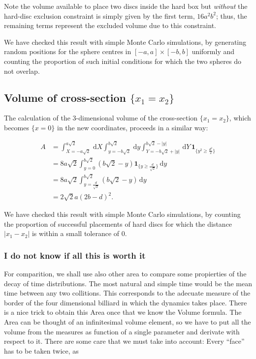 \documentclass[letterpaper,10pt]{article}
\newcommand{\rd}{\, \mathrm{d}}
\newcommand{\indicator}[1]{\mathbf{1}_{ \{   #1 \} } }
\begin{document}
Note the volume available to place two discs inside the hard box but \emph{without} the 
 hard-disc exclusion constraint is simply given by the first term, $16 a^2 b^2$; thus, the remaining terms represent the excluded volume due to this constraint.

We have checked this result with simple Monte Carlo simulations, by generating random positions for the sphere centres in $[-a,a] \times [-b,b]$ uniformly and 
counting the proportion of such initial conditions for which the two spheres do not overlap.



\subsection{Volume of cross-section $\{x_1 = x_2\}$}
The calculation of the $3$-dimensional volume of the cross-section $\{x_1 = x_2\}$, which becomes 
$\{ x=0 \}$ in the new coordinates, proceeds in a similar way:

\begin{align}
 A &= \int_{X=-a \sqrt{2} }^{a \sqrt{2}}  \rd X
 \int_{y=-b \sqrt{2}}^{b \sqrt{2}} \rd y
\int_{Y=-b \sqrt{2} + |y| }^{b \sqrt{2}-|y|}  \rd Y
\, \indicator{y^2 \ge \frac{d^2}{2} } \\
&= 8 a \sqrt{2} \int_{y=0}^{b \sqrt{2}} \left( b \sqrt{2} - y \right)  \indicator{y \ge \frac{d}{\sqrt{2}}}  \rd y \\
&= 8 a \sqrt{2} \int_{y= \frac{d}{\sqrt{2}}}^{b \sqrt{2}}  \left( b \sqrt{2} - y \right)  \rd y \\
&= 2 \sqrt{2} a ( 2b - d )^2.
\end{align}

We have checked this result with simple Monte Carlo simulations, by counting the proportion of successful placements of hard discs for which the distance $|x_1 - x_2|$ is within a small tolerance of $0$.


\subsubsection{I do not know if all this is worth it\ldot}
For comparition, we shall use also other area to compare
some propierties of the decay of time distributions. The most natural and simple
time would be the mean time between any two collitions. This corresponds
to the adecuate measure of the border of the four dimensional
billiard in which the dynamics takes place. There is a nice trick
to obtain this Area once that we know the Volume formula. The Area
can be thought of an infinitesimal volume element, so we have to put
all the volume from the measures as function of a single parameter
and derivate with respect to it. 
There are some care that we must take into account:
Every ``face'' has to be taken twice, as  
\end{document}
